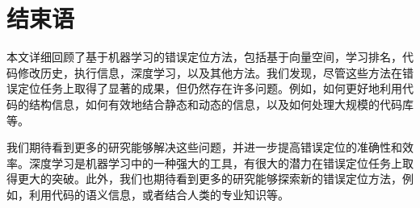 \section{结束语}
本文详细回顾了基于机器学习的错误定位方法，包括基于向量空间，学习排名，代码修改历史，执行信息，深度学习，以及其他方法。我们发现，尽管这些方法在错误定位任务上取得了显著的成果，但仍然存在许多问题。例如，如何更好地利用代码的结构信息，如何有效地结合静态和动态的信息，以及如何处理大规模的代码库等。

我们期待看到更多的研究能够解决这些问题，并进一步提高错误定位的准确性和效率。深度学习是机器学习中的一种强大的工具，有很大的潜力在错误定位任务上取得更大的突破。此外，我们也期待看到更多的研究能够探索新的错误定位方法，例如，利用代码的语义信息，或者结合人类的专业知识等。